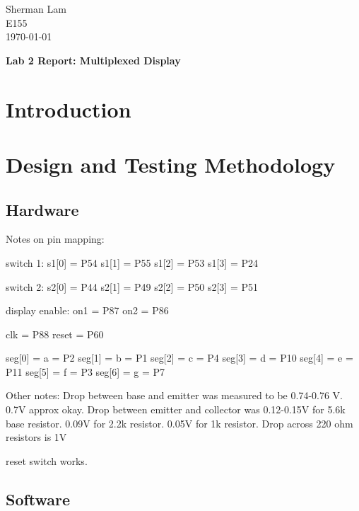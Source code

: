 \documentclass[11pt]{article}
\begin{document}
\begin{flushleft}
Sherman Lam
\\E155
\\ \today
\end{flushleft}


\begin{center}
\begin{Large}
\textbf{Lab 2 Report: Multiplexed Display}
\end{Large}
\end{center}




\section{Introduction}
\label{sec:intro}



\section{Design and Testing Methodology}

\subsection{Hardware}

Notes on pin mapping:

switch 1:
s1[0] = P54
s1[1] = P55
s1[2] = P53
s1[3] = P24

switch 2:
s2[0] = P44
s2[1] = P49
s2[2] = P50
s2[3] = P51

display enable:
on1 = P87
on2 = P86

clk = P88
reset = P60

seg[0] = a = P2
seg[1] = b = P1
seg[2] = c = P4
seg[3] = d = P10
seg[4] = e = P11
seg[5] = f = P3
seg[6] = g = P7


Other notes:
Drop between base and emitter was measured to be 0.74-0.76 V. 0.7V approx okay.
Drop between emitter and collector was 0.12-0.15V for 5.6k base resistor. 0.09V for 2.2k resistor. 0.05V for 1k resistor. 
Drop across 220 ohm resistors is 1V

reset switch works.




\subsection{Software}
\end{document}
